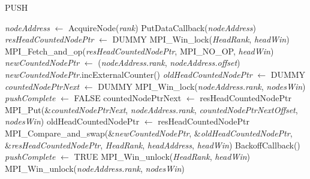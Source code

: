\documentclass{article}
\begin{document}
	\begin{algorithm}
		\caption{PUSH}
		\begin{algorithmic}[1]
			\STATE \textit{nodeAddress} $\leftarrow$ AcquireNode(\textit{rank})
			\STATE PutDataCallback(\textit{nodeAddress})
			\RETURN
			\ENDIF
			\STATE \textit{resHeadCountedNodePtr} $\leftarrow$ DUMMY
			\STATE MPI\_Win\_lock(\textit{HeadRank}, \textit{headWin})
			\STATE MPI\_Fetch\_and\_op(\textit{resHeadCountedNodePtr}, MPI\_NO\_OP, \textit{headWin})
			\STATE \textit{newCountedNodePtr} $\leftarrow$ (\textit{nodeAddress.rank}, \textit{nodeAddress.offset})
			\STATE \textit{newCountedNodePtr}.incExternalCounter()
			\STATE \textit{oldHeadCountedNodePtr} $\leftarrow$ DUMMY 
			\STATE \textit{countedNodePtrNext}  $\leftarrow$ DUMMY 
			\STATE MPI\_Win\_lock(\textit{nodeAddress.rank}, \textit{nodesWin}) 
			\STATE \textit{pushComplete} $\leftarrow$ FALSE 
			\STATE countedNodePtrNext $\leftarrow$ resHeadCountedNodePtr 
			\STATE MPI\_Put(\&\textit{countedNodePtrNext}, 
			\textit{nodeAddress.rank}, 
			\textit{countedNodePtrNextOffset}, 
			\textit{nodesWin}) 
			\STATE oldHeadCountedNodePtr $\leftarrow$ resHeadCountedNodePtr 
			\STATE MPI\_Compare\_and\_swap(\&\textit{newCountedNodePtr}, 
			\&\textit{oldHeadCountedNodePtr}, 
			\&\textit{resHeadCountedNodePtr}, 
			\textit{HeadRank}, 
			\textit{headAddress}, 
			\textit{headWin})
			\STATE BackoffCallback() 
			\ELSE 
			\STATE \textit{pushComplete} $\leftarrow$ TRUE 
			\ENDIF 
			\ENDWHILE
			\STATE MPI\_Win\_unlock(\textit{HeadRank}, \textit{headWin})
			\STATE MPI\_Win\_unlock(\textit{nodeAddress.rank}, \textit{nodesWin}) 
		\end{algorithmic}
	\end{algorithm}
\end{document}
